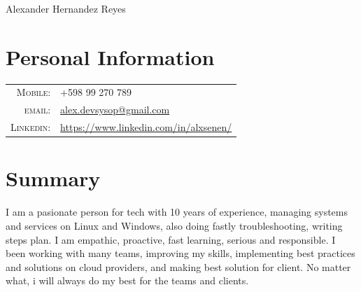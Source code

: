 \documentclass[a4paper,12pt]{article}
\begin{document}
\vspace*{-0.5cm}

\pagestyle{empty} %

{\huge Alexander Hernandez Reyes}
\hfill
{}\\
\section{Personal Information}
\begin{tabular}{rl}
    \textsc{Mobile:}    & +598 99 270 789 \\
    \textsc{email:}     & \href{mailto:alex.devsysop@gmail.com}{alex.devsysop@gmail.com} \\
    \textsc{Linkedin:}  & \href{https://www.linkedin.com/in/alxsenen/}{https://www.linkedin.com/in/alxsenen/} \\
\end{tabular}

\section{Summary}
\justify
I am a pasionate person for tech with 10 years of experience, managing systems and services on Linux and Windows, also doing fastly troubleshooting, writing steps plan. I am empathic, proactive, fast learning, serious and responsible.
I been working with many teams, improving my skills, implementing best practices and solutions on cloud providers, and making best solution for client. No matter what, i will always do my best for the teams and clients.

\end{document}
